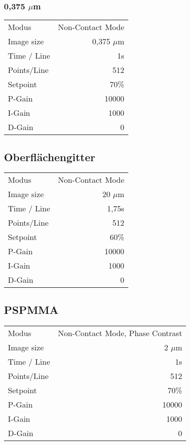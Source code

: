 \subsubsection{0,375 $\mu$m}
\begin{center}
    \centering
    \begin{tabular}{l|r}
        Modus & Non-Contact Mode\\
        Image size & 0,375 $\mu$m \\
        Time / Line & 1s \\
        Points/Line & 512\\
        Setpoint & 70\% \\
        P-Gain & 10000 \\
        I-Gain & 1000 \\
        D-Gain & 0 \\
        
    \end{tabular}
\end{center}

\subsection{Oberflächengitter}

\begin{center}
    \centering
    \begin{tabular}{l|r}
        Modus & Non-Contact Mode\\
        Image size & 20 $\mu$m \\
        Time / Line & 1,75s \\
        Points/Line & 512\\
        Setpoint & 60\% \\
        P-Gain & 10000 \\
        I-Gain & 1000 \\
        D-Gain & 0 \\
        
    \end{tabular}
\end{center}

\subsection{PSPMMA}

\begin{center}
    \centering
    \begin{tabular}{l|r}
        Modus & Non-Contact Mode, Phase Contrast\\
        Image size & 2 $\mu$m \\
        Time / Line & 1s \\
        Points/Line & 512\\
        Setpoint & 70\% \\
        P-Gain & 10000 \\
        I-Gain & 1000 \\
        D-Gain & 0 \\
        
    \end{tabular}
\end{center}




